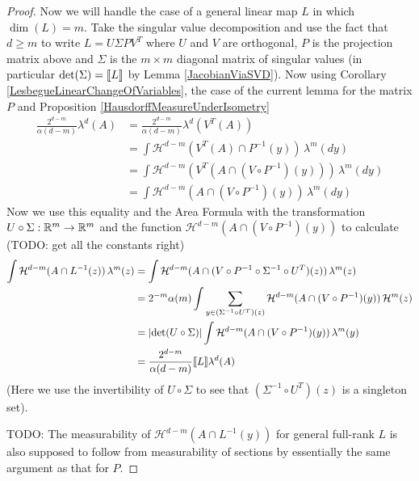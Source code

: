 \begin{proof}
Now we will handle the case of a general linear map $L$ in which $\dim(L)  = m$.  Take the singular value decomposition and use the fact that $d \geq m$ to write $L = U \Sigma P V^T$ where
$U$ and $V$ are orthogonal, $P$ is the projection matrix above and $\Sigma$ is the $m \times m$ diagonal matrix of singular values (in particular $\det(\Sigma) = \llbracket L \rrbracket$ by Lemma \ref{JacobianViaSVD}).  
Now using Corollary \ref{LesbegueLinearChangeOfVariables}, the case of the current lemma for the matrix $P$ and Proposition \ref{HausdorffMeasureUnderIsometry}
\begin{align*}
\frac{2^{d-m}} {\alpha(d-m)} \lambda^d(A) &= \frac{2^{d-m}} {\alpha(d-m)} \lambda^d( V^T (A)) \\
&= \int \mathcal{H}^{d-m}(V^T(A) \cap P^{-1}(y)) \, \lambda^m(dy) \\
&= \int \mathcal{H}^{d-m}(V^T(A \cap (V \circ P^{-1})(y))) \, \lambda^m(dy) \\
&= \int \mathcal{H}^{d-m}(A \cap (V \circ P^{-1})(y)) \, \lambda^m(dy) 
\end{align*}
Now we use this equality and the Area Formula with the transformation $U \circ \Sigma : \mathbb{R}^m \to \mathbb{R}^m$ and the function $\mathcal{H}^{d-m} (A \cap (V \circ P^{-1})(y))$ to calculate (TODO: get all the constants right)
\begin{align*}
\int \mathcal{H}^{d-m} (A \cap L^{-1}(z)) \, \lambda^m(z) &= \int \mathcal{H}^{d-m} (A \cap (V \circ P^{-1} \circ \Sigma^{-1} \circ U^T)(z)) \, \lambda^m(z) \\
&=2^{-m} \alpha(m) \int \sum_{y \in (\Sigma^{-1} \circ U^T)(z)} \mathcal{H}^{d-m} (A \cap (V \circ P^{-1})(y)) \, \mathcal{H}^m(z) \\
&= \left \vert \det(U \circ \Sigma) \right \vert \int \mathcal{H}^{d-m} (A \cap (V \circ P^{-1})(y)) \, \lambda^m(y) \\
&= \frac{2^{d-m}} {\alpha(d-m)} \llbracket L \rrbracket \lambda^d(A) 
\end{align*}
(Here we use the invertibility of $U \circ \Sigma$ to see that $(\Sigma^{-1} \circ U^T)(z)$ is a singleton set).

TODO: The measurability of $\mathcal{H}^{d-m}(A \cap L^{-1}(y))$ for general full-rank $L$ is also supposed to follow from measurability of sections by essentially the same argument as that for $P$.
\end{proof}

